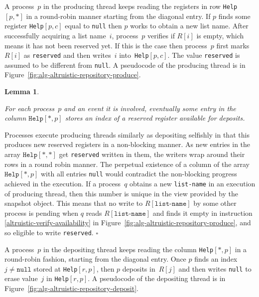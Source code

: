 \documentclass[11pt]{article}
\newcommand{\qed}{\hfill $\square$ \smallbreak}
\newenvironment{proof}{\noindent{\bf Proof:}}{\qed}
\newtheorem{lemma}{Lemma}
\begin{document}
A process~$p$ in the producing thread keeps reading the registers in row \texttt{Help}$[p,*]$ in a round-robin manner starting from the diagonal entry. 
If $p$ finds some register \texttt{Help}$[p,c]$ equal to \texttt{null} then $p$ works to obtain a new list name.
After successfully acquiring a list name~$i$, process~$p$ verifies if $R[i]$ is empty, which means it has not been reserved yet.
If this is the case then process~$p$ first marks $R[i]$ as \texttt{reserved} and then writes~$i$ into~\texttt{Help}$[p,c]$.
The value \texttt{reserved} is assumed to be different from \texttt{null}.
A pseudocode of the producing thread is in Figure~\ref{fig:alg-altruistic-repository-produce}.



\begin{lemma}
\label{lem:column-nonempty}

For each process~$p$ and an event it is involved, eventually some entry in the column $\texttt{Help}[*,p]$ stores an index of a reserved register available for deposits. 
\end{lemma}

\begin{proof}
Processes execute producing threads similarly as depositing selfishly in that this produces new reserved registers in a non-blocking manner.
As new entries in the array $\texttt{Help}[*,*]$ get \texttt{reserved} written in them, the writers wrap around their rows in a round robin manner.
The perpetual existence of a column of the array $\texttt{Help}[*,p]$ with all entries \texttt{null} would contradict the non-blocking progress achieved in the execution.
If a process~$q$ obtains a new \texttt{list-name} in an execution of producing thread, then this number is unique in the view provided by the snapshot object. 
This means that no write to $R[\texttt{list-name}]$ by some other process is pending when $q$ reads $R[\texttt{list-name}]$ and finds it empty in instruction \eqref{altruistic-verify-availability} in Figure~\ref{fig:alg-altruistic-repository-produce}, and so eligible to write \texttt{reserved}.
\end{proof}


A process~$p$ in the depositing thread keeps reading the column \texttt{Help}$[*,p]$ in a round-robin fashion, starting from the diagonal entry.
Once $p$ finds an index $j\ne \texttt{null}$ stored at \texttt{Help}$[r,p]$, then $p$ deposits in~$R[j]$ and then writes \texttt{null} to erase value~$j$ in \texttt{Help}$[r,p]$.
A pseudocode of the depositing thread is in Figure~\ref{fig:alg-altruistic-repository-deposit}.
\end{document}
